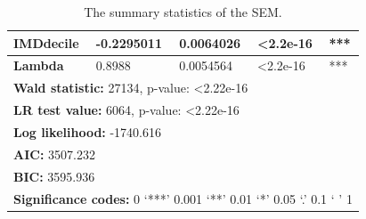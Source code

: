 \begin{table}[]
\begin{tabular}{|lllll|}
\multicolumn{1}{|l|}{IMDdecile}         & \multicolumn{1}{l|}{-0.2295011}           & \multicolumn{1}{l|}{0.0064026}           & \multicolumn{1}{l|}{\textless 2.2e-16} & ***                   \\ \hline \hline
\multicolumn{1}{|l|}{\textbf{Lambda}}            & \multicolumn{1}{l|}{0.8988}              & \multicolumn{1}{l|}{0.0054564}           & \multicolumn{1}{l|}{\textless 2.2e-16} & ***                   \\ \hline \hline
\multicolumn{5}{|l|}{\textbf{Wald statistic:} 27134, p-value: \textless 2.22e-16}                                                                                                                        \\ \hline
\multicolumn{5}{|l|}{\textbf{LR test value:} 6064, p-value: \textless 2.22e-16}                                                                                                                     \\ \hline
\multicolumn{5}{|l|}{\textbf{Log likelihood:} -1740.616}                                                                                                                                              \\ \hline
\multicolumn{5}{|l|}{\textbf{AIC:} 3507.232}                                                                                                                                                             \\ \hline
\multicolumn{5}{|l|}{\textbf{BIC:} 3595.936}                                                                                                                                                           \\ \hline \hline
\multicolumn{5}{|l|}{\textbf{Significance codes:} 0 ‘***’ 0.001 ‘**’ 0.01 ‘*’ 0.05 ‘.’ 0.1 ‘ ’ 1}                                                                                                      \\ \hline
\end{tabular}
\caption{
The summary statistics of the SEM.
}
\label{tab: A4.7}
\end{table}


